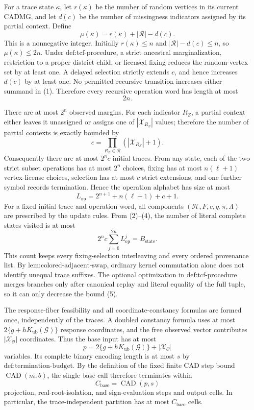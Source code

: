 For a trace state \(\kappa\), let \(r(\kappa)\) be the number of random vertices in its current CADMG, and let \(d(c)\) be the number of missingness indicators assigned by its partial context.  Define
\[
\mu(\kappa)=r(\kappa)+|\mathcal R|-d(c).
\tag{1}
\]
This is a nonnegative integer.  Initially \(r(\kappa)\leq n\) and \(|\mathcal R|-d(c)\leq n\), so \(\mu(\kappa)\leq2n\).  Under \(\text{def:tcf-procedure}\), a strict ancestral marginalization, restriction to a proper district child, or licensed fixing reduces the random-vertex set by at least one.  A delayed selection strictly extends \(c\), and hence increases \(d(c)\) by at least one.  No permitted recursive transition increases either summand in (1).  Therefore every recursive operation word has length at most
\[
2n.
\tag{2}
\]

There are at most \(2^n\) observed margins.  For each indicator \(R_Z\), a partial context either leaves it unassigned or assigns one of \(|\mathcal X_{R_Z}|\) values; therefore the number of partial contexts is exactly bounded by
\[
c=\prod_{R_Z\in\mathcal R}(|\mathcal X_{R_Z}|+1).
\tag{3}
\]
Consequently there are at most \(2^n c\) initial traces.  From any state, each of the two strict subset operations has at most \(2^n\) choices, fixing has at most \(n(\ell+1)\) vertex-license choices, selection has at most \(c\) strict extensions, and one further symbol records termination.  Hence the operation alphabet has size at most
\[
L_{\mathrm{op}}=2^{n+1}+n(\ell+1)+c+1.
\tag{4}
\]
For a fixed initial trace and operation word, all components \((\mathcal H,F,c,q,\pi,\Lambda)\) are prescribed by the update rules.  From (2)--(4), the number of literal complete states visited is at most
\[
2^n c\sum_{j=0}^{2n}L_{\mathrm{op}}^j
=B_{\mathrm{state}}.
\tag{5}
\]
This count keeps every fixing-selection interleaving and every ordered provenance list.  By \(\text{lem:colored-adjacent-swap}\), ordinary kernel commutation alone does not identify unequal trace suffixes.  The optional optimization in \(\text{def:tcf-procedure}\) merges branches only after canonical replay and literal equality of the full tuple, so it can only decrease the bound (5).

The response-fiber feasibility and all coordinate-constancy formulas are formed once, independently of the traces.  A doubled constancy formula uses at most \(2\{g+hK_{\mathrm{ub}}(\mathcal G)\}\) response coordinates, and the free observed vector contributes \(|\mathcal X_{\mathcal O}|\) coordinates.  Thus the base input has at most
\[
p=2\{g+hK_{\mathrm{ub}}(\mathcal G)\}+|\mathcal X_{\mathcal O}|
\tag{6}
\]
variables.  Its complete binary encoding length is at most \(s\) by \(\text{def:termination-budget}\).  By the definition of the fixed finite CAD step bound \(\operatorname{CAD}(m,b)\), the single base call therefore terminates within
\[
C_{\mathrm{base}}=\operatorname{CAD}(p,s)
\tag{7}
\]
projection, real-root-isolation, and sign-evaluation steps and output cells.  In particular, the trace-independent partition has at most \(C_{\mathrm{base}}\) cells.

